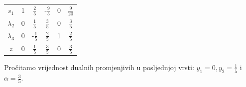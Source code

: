 \documentclass[a4paper, utf8, 11pt, colorlinks]{book}
\theoremstyle{definition}
\begin{document}
\begin{center}
	
	\begin{tabular}{c|cccc|c}\vspace{1mm}
		$s_1$	    &   1      &    $\frac{2}{5}$          &   -$\frac{9}{5}$       &   0          &  $\frac{9}{20}$ \\\vspace{1mm}
		$\lambda_2$  &   0      &    $\frac{1}{5}$         &   $\frac{3}{5}$        &   0          &  $\frac{3}{5}$             \\\vspace{1mm}
		$\lambda_3$  &   0      &    -$\frac{1}{5}$        &   $\frac{2}{5}$        &   1          &  $\frac{2}{5}$            \\ \hline\vspace{1mm}
		$z$          &   0      &    $\frac{1}{5}$         &  $ \frac{3}{5}$        &   0           & $\frac{3}{5}$
	\end{tabular}
	
\end{center} 
  Pročitamo vrijednost dualnih promjenjivih u posljednjoj vrsti: $y_1 =0, y_2=\frac{1}{5}$ i $\alpha=\frac{3}{5}$.
  
\end{document}
